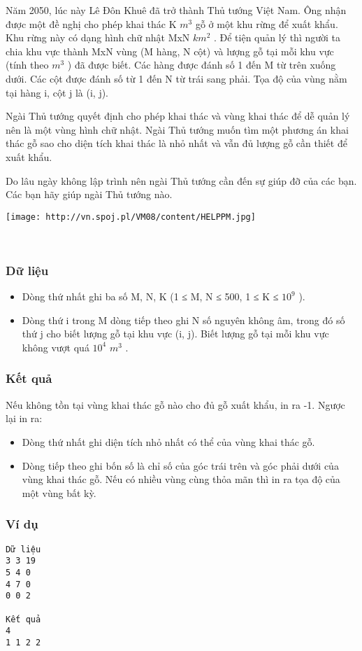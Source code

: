 

Năm 2050, lúc này Lê Đôn Khuê đã trở thành Thủ tướng Việt Nam. Ông nhận được một đề nghị cho phép khai thác K $m^{3}$ gỗ ở một khu rừng để xuất khẩu. Khu rừng này có dạng hình chữ nhật MxN $km^{2}$ . Để tiện quản lý thì người ta chia khu vực thành MxN vùng (M hàng, N cột) và lượng gỗ tại mỗi khu vực (tính theo $m^{3}$ ) đã được biết. Các hàng được đánh số 1 đến M từ trên xuống dưới. Các cột được đánh số từ 1 đến N từ trái sang phải. Tọa độ của vùng nằm tại hàng i, cột j là (i, j).

Ngài Thủ tướng quyết định cho phép khai thác và vùng khai thác để dễ quản lý nên là một vùng hình chữ nhật. Ngài Thủ tướng muốn tìm một phương án khai thác gỗ sao cho diện tích khai thác là nhỏ nhất và vẫn đủ lượng gỗ cần thiết để xuất khẩu.

Do lâu ngày không lập trình nên ngài Thủ tướng cần đến sự giúp đỡ của các bạn. Các bạn hãy giúp ngài Thủ tướng nào.


\texttt{[image: http://vn.spoj.pl/VM08/content/HELPPM.jpg]}

 

\subsubsection{Dữ liệu}
\begin{itemize}
	\item Dòng thứ nhất ghi ba số M, N, K (1 ≤ M, N ≤ 500, 1 ≤ K ≤ $10^{9}$ ).
	\item Dòng thứ i trong M dòng tiếp theo ghi N số nguyên không âm, trong đó số thứ j cho biết lượng gỗ tại khu vực (i, j). Biết lượng gỗ tại mỗi khu vực không vượt quá $10^{4}$ $m^{3}$ .
\end{itemize}

\subsubsection{Kết quả}

Nếu không tồn tại vùng khai thác gỗ nào cho đủ gỗ xuất khẩu, in ra -1. Ngược lại in ra:
\begin{itemize}
	\item Dòng thứ nhất ghi diện tích nhỏ nhất có thể của vùng khai thác gỗ.
	\item Dòng tiếp theo ghi bốn số là chỉ số của góc trái trên và góc phải dưới của vùng khai thác gỗ. Nếu có nhiều vùng cùng thỏa mãn thì in ra tọa độ của một vùng bất kỳ.
\end{itemize}

\subsubsection{Ví dụ}
\begin{verbatim}
Dữ liệu
3 3 19
5 4 0
4 7 0
0 0 2

Kết quả
4
1 1 2 2
\end{verbatim}
